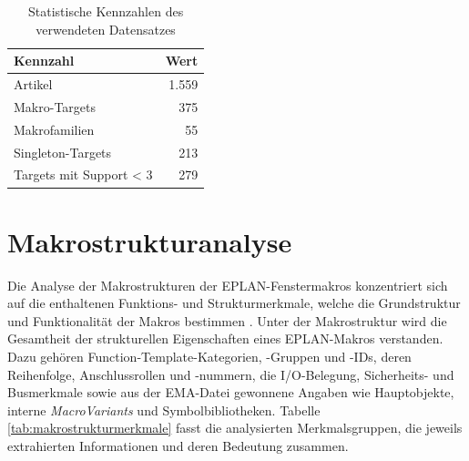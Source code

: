 \begin{table}[H] 
    \centering 
    \caption{Statistische Kennzahlen des verwendeten Datensatzes} 
    \label{tab:datensatzstatistik} 
    \begin{tabular}{lr} 
        \toprule 
        \textbf{Kennzahl} & \textbf{Wert} \\ 
        \midrule 
        Artikel & 1.559 \\ 
        Makro-Targets & 375 \\ 
        Makrofamilien & 55 \\ 
        Singleton-Targets & 213 \\ 
        Targets mit Support < 3 & 279 \\ 
        \bottomrule 
    \end{tabular} 
\end{table}


\section{Makrostrukturanalyse}

Die Analyse der Makrostrukturen der EPLAN-Fenstermakros \parencite{EPLAN-Makros} konzentriert sich auf die enthaltenen Funktions- und Strukturmerkmale, welche die Grundstruktur und Funktionalität der Makros bestimmen \parencite{srcStep911}. Unter der Makrostruktur wird die Gesamtheit der strukturellen Eigenschaften eines EPLAN-Makros \parencite{EPLAN-Makros} verstanden. Dazu gehören Function-Template-Kategorien, -Gruppen und -IDs, deren Reihenfolge, Anschlussrollen und -nummern, die I/O-Belegung, Sicherheits- und Busmerkmale sowie aus der EMA-Datei gewonnene Angaben wie Hauptobjekte, interne \textit{MacroVariants} und Symbolbibliotheken.
Tabelle \ref{tab:makrostrukturmerkmale} fasst die analysierten Merkmalsgruppen, die jeweils extrahierten Informationen und deren Bedeutung zusammen.

